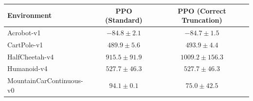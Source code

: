 \begin{tabular}{lcc}
\toprule
             Environment &   PPO (Standard) & PPO (Correct Truncation) \\
\midrule
              Acrobot-v1 &  $-84.8 \pm 2.1$ &          $-84.7 \pm 1.5$ \\
             CartPole-v1 &  $489.9 \pm 5.6$ &          $493.9 \pm 4.4$ \\
          HalfCheetah-v4 & $915.5 \pm 91.9$ &       $1009.2 \pm 156.3$ \\
             Humanoid-v4 & $527.7 \pm 46.3$ &         $527.7 \pm 46.3$ \\
MountainCarContinuous-v0 &   $94.1 \pm 0.1$ &          $75.0 \pm 42.5$ \\
\bottomrule
\end{tabular}
